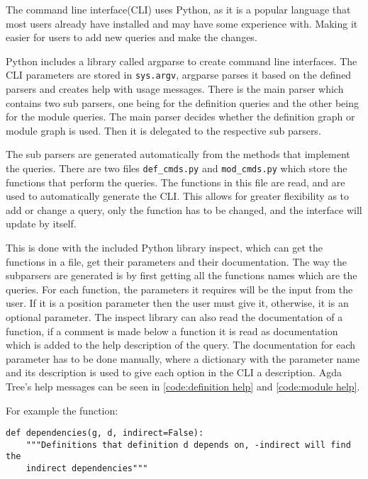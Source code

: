 The command line interface(CLI) uses Python, as it is a popular language that
most users already have installed and may have some experience with. Making it
easier for users to add new queries and make the changes. 

Python includes a library called argparse to create command line interfaces.
The CLI parameters are stored in \texttt{sys.argv}, argparse parses it based on the
defined parsers and creates help with usage messages. There is the main parser
which contains two sub parsers, one being for the definition queries and the
other being for the module queries. The main parser decides whether the
definition graph or module graph is used. Then it is delegated to the
respective sub parsers.


The sub parsers are generated automatically from the methods that implement the
queries. There are two files \texttt{def\_cmds.py} and \texttt{mod\_cmds.py} which store the functions
that perform the queries. The functions in this file are read, and are used to
automatically generate the CLI. This allows for greater flexibility as to add
or change a query, only the function has to be changed, and the interface will
update by itself.

This is done with the included Python library inspect, which can get the
functions in a file, get their parameters and their documentation. The way the
subparsers are generated is by first getting all the functions names which are
the queries. For each function, the parameters it requires will be the input
from the user. If it is a position parameter then the user must give it,
otherwise, it is an optional parameter. The inspect library can also read the
documentation of a function, if a comment is made below a function it is read
as documentation which is added to the help description of the query. The
documentation for each parameter has to be done manually, where a dictionary
with the parameter name and its description is used to give each option in the
CLI a description. Agda Tree's help messages can be seen in
\cref{code:definition help} and \cref{code:module help}.

For example the function:

\begin{lstlisting}
def dependencies(g, d, indirect=False):
    """Definitions that definition d depends on, -indirect will find the
    indirect dependencies"""
\end{lstlisting}

